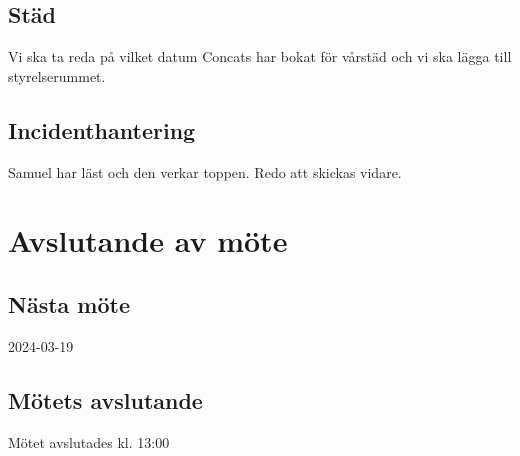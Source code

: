 \documentclass[protokoll]{dvd}
\begin{document}
\subsection*{Städ}
Vi ska ta reda på vilket datum Concats har bokat för vårstäd och vi ska lägga till styrelserummet.

\subsection*{Incidenthantering}
Samuel har läst och den verkar toppen. Redo att skickas vidare.

\newpage
\section{Avslutande av möte}

\subsection{Nästa möte}
2024-03-19

\subsection{Mötets avslutande}
Mötet avslutades kl. 13:00

\styrelsesignaturer
\end{document}
